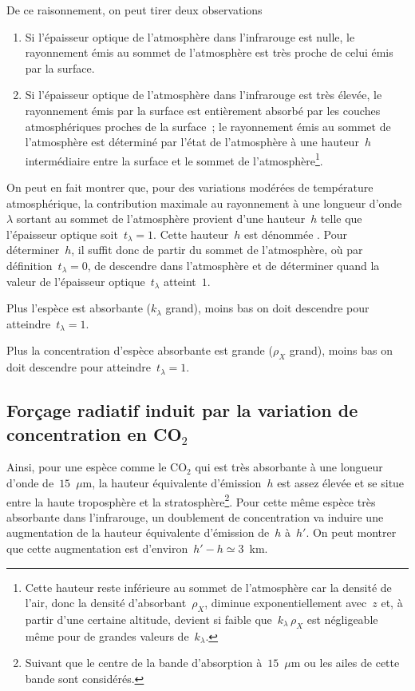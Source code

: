 \sk
De ce raisonnement, on peut tirer deux observations
\begin{enumerate}
\item Si l'épaisseur optique de l'atmosphère dans l'infrarouge est nulle, le rayonnement émis au sommet de l'atmosphère est très proche de celui émis par la surface.
\item Si l'épaisseur optique de l'atmosphère dans l'infrarouge est très élevée, le rayonnement émis par la surface est entièrement absorbé par les couches atmosphériques proches de la surface~; le rayonnement émis au sommet de l'atmosphère est déterminé par l'état de l'atmosphère à une hauteur~$h$ intermédiaire entre la surface et le sommet de l'atmosphère\footnote{Cette hauteur reste inférieure au sommet de l'atmosphère car la densité de l'air, donc la densité d'absorbant~$\rho_X$, diminue exponentiellement avec~$z$ et, à partir d'une certaine altitude, devient si faible que~$k_\lambda \, \rho_X$ est négligeable même pour de grandes valeurs de~$k_\lambda$.}. 
\end{enumerate}
On peut en fait montrer que, pour des variations modérées de température atmosphérique, la contribution maximale au rayonnement à une longueur d'onde~$\lambda$ sortant au sommet de l'atmosphère provient d'une hauteur~$h$ telle que l'épaisseur optique soit~$t_\lambda = 1$. Cette hauteur~$h$ est dénommée . Pour déterminer~$h$, il suffit donc de partir du sommet de l'atmosphère, où par définition~$t_\lambda = 0$, de descendre dans l'atmosphère et de déterminer quand la valeur de l'épaisseur optique~$t_\lambda$ atteint~$1$.
\begin{citemize}
\item Plus l'espèce est absorbante ($k_\lambda$ grand), moins bas on doit descendre pour atteindre~$t_\lambda = 1$.
\item Plus la concentration d'espèce absorbante est grande ($\rho_X$ grand), moins bas on doit descendre pour atteindre~$t_\lambda = 1$.
\end{citemize}

\sk
\subsection{Forçage radiatif induit par la variation de concentration en CO$_2$}

\sk
Ainsi, pour une espèce comme le CO$_2$ qui est très absorbante à une longueur d'onde de~$15$~$\mu$m, la hauteur équivalente d'émission~$h$ est assez élevée et se situe entre la haute troposphère et la stratosphère\footnote{Suivant que le centre de la bande d'absorption à~$15$~$\mu$m ou les ailes de cette bande sont considérés.}. Pour cette même espèce très absorbante dans l'infrarouge, un doublement de concentration va induire une augmentation de la hauteur équivalente d'émission de~$h$ à~$h'$. On peut montrer que cette augmentation est d'environ~$h'-h \simeq 3$~km. 

